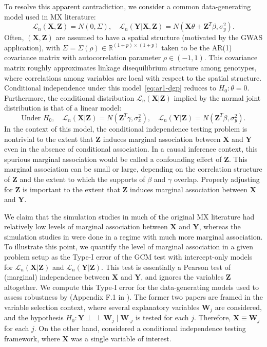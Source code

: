 \documentclass[aos]{imsart}
\theoremstyle{plain}
\theoremstyle{remark}
\newcommand{\R}{\mathbb{R}}								%
\newcommand{\independent}{{\perp \! \! \! \perp}}		%
\newcommand{\prx}{\bm X}								%
\newcommand{\prz}{\bm Z}								%
\newcommand{\pry}{{\bm Y}}								%
\newcommand{\law}{\mathcal L}							%
\begin{document}
To resolve this apparent contradiction, we consider a common data-generating model used in MX literature:
\begin{equation}
    \law_n(\prx, \prz) = N(0, \Sigma), \quad \law_n(\pry|\prx,\prz) = N(\prx \theta + \prz^T \beta, \sigma^2_y).
    \label{eq:ar1-dgp}
\end{equation}
Often, $(\prx, \prz)$ are assumed to have a spatial structure (motivated by the GWAS application), with $\Sigma = \Sigma(\rho) \in \R^{(1+p) \times (1+p)}$ taken to be the AR(1) covariance matrix with autocorrelation parameter $\rho \in (-1,1)$. This covariance matrix roughly approximates linkage disequilibrium structure among genotypes, where correlations among variables are local with respect to the spatial structure. Conditional independence under this model~\eqref{eq:ar1-dgp} reduces to $H_0: \theta = 0$. Furthermore, the conditional distribution $\law_n(\prx|\prz)$ implied by the normal joint distribution is that of a linear model:
\begin{equation}
    \text{Under } H_0, \quad  \law_n(\prx | \prz) = N(\prz^T \gamma, \sigma^2_x), \quad \law_n(\pry|\prz) = N(\prz^T \beta, \sigma^2_y).
\end{equation}
In the context of this model, the conditional independence testing problem is nontrivial to the extent that $\prz$ induces marginal association between $\prx$ and $\pry$ even in the absence of conditional association. In a causal inference context, this spurious marginal association would be called a confounding effect of $\prz$. This marginal association can be small or large, depending on the correlation structure of $\prz$ and the extent to which the supports of $\beta$ and $\gamma$ overlap. Properly adjusting for $\prz$ is important to the extent that $\prz$ induces marginal association between $\prx$ and $\pry$.

We claim that the simulation studies in much of the original MX literature had relatively low levels of marginal association between $\prx$ and $\pry$, whereas the simulation studies in \citet{Li2022} were done in a regime with much more marginal association. To illustrate this point, we quantify the level of marginal association in a given problem setup as the Type-I error of the GCM test with intercept-only models for $\law_n(\prx|\prz)$ and $\law_n(\pry|\prz)$. This test is essentially a Pearson test of (marginal) independence between $\prx$ and $\pry$, and ignores the variables $\prz$ altogether. We compute this Type-I error for the data-generating models used to assess robustness by \citet{CetL16, Liu2022a, Li2022} (Appendix F.1 in \cite{supplementary}). The former two papers are framed in the variable selection context, where several explanatory variables $\bm W_j$ are considered, and the hypothesis $H_0: \pry \independent \bm W_j \mid \bm W_{\text{-}j}$ is tested for each $j$. Therefore, $\prx \equiv \bm W_j$ for each $j$. On the other hand, \citet{Li2022} considered a conditional independence testing framework, where $\prx$ was a single variable of interest.
\end{document}
